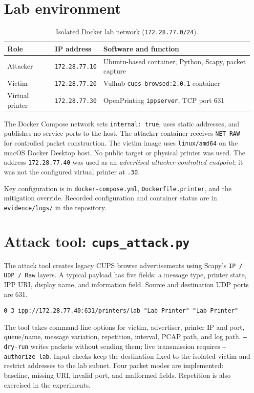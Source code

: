 \documentclass[11pt,a4paper]{article}
\begin{document}
\section{Lab environment}
\begin{table}[htbp]\centering\small
\caption{Isolated Docker lab network (\texttt{172.28.77.0/24}).}
\begin{tabularx}{\linewidth}{@{}l l X@{}}\toprule
Role & IP address & Software and function\\\midrule
Attacker & \texttt{172.28.77.10} & Ubuntu-based container, Python, Scapy, packet capture\\
Victim & \texttt{172.28.77.20} & Vulhub \texttt{cups-browsed:2.0.1} container\\
Virtual printer & \texttt{172.28.77.30} & OpenPrinting \texttt{ippserver}, TCP port 631\\\bottomrule
\end{tabularx}
\end{table}

The Docker Compose network sets \texttt{internal: true}, uses static addresses, and publishes no service ports to the host. The attacker container receives \texttt{NET\_RAW} for controlled packet construction. The victim image uses \texttt{linux/amd64} on the macOS Docker Desktop host. No public target or physical printer was used. The address \texttt{172.28.77.40} was used as an \emph{advertised attacker-controlled endpoint}; it was not the configured virtual printer at \texttt{.30}.

Key configuration is in \texttt{docker-compose.yml}, \texttt{Dockerfile.printer}, and the mitigation override. Recorded configuration and container status are in \texttt{evidence/logs/} in the repository.

\section{Attack tool: \texttt{cups\_attack.py}}
The attack tool creates legacy CUPS browse advertisements using Scapy's \texttt{IP / UDP / Raw} layers. A typical payload has five fields: a message type, printer state, IPP URI, display name, and information field. Source and destination UDP ports are 631.

\begin{lstlisting}
0 3 ipp://172.28.77.40:631/printers/lab "Lab Printer" "Lab Printer"
\end{lstlisting}

The tool takes command-line options for victim, advertiser, printer IP and port, queue/name, message variation, repetition, interval, PCAP path, and log path. \texttt{--dry-run} writes packets without sending them; live transmission requires \texttt{--authorize-lab}. Input checks keep the destination fixed to the isolated victim and restrict addresses to the lab subnet. Four packet modes are implemented: baseline, missing URI, invalid port, and malformed fields. Repetition is also exercised in the experiments.
\end{document}
